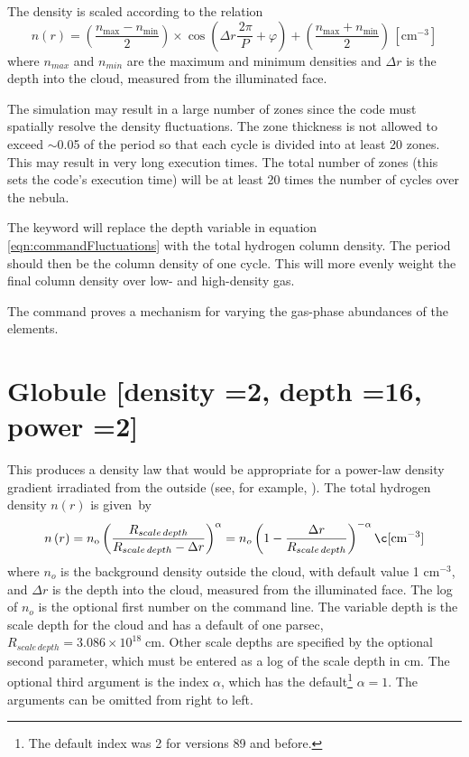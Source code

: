 The density is scaled according to the relation
\begin{equation}
\label{eqn:commandFluctuations}
n\left( r \right) = \left( {\frac{{n_{\max }  - n_{\min } }}{2}} \right)
\times \cos \left( {\Delta r\frac{{\,2\pi }}{P} + \varphi } \right) + \left(
{\frac{{n_{\max }  + n_{\min } }}{2}} \right)\, [\mathrm{cm}^{-3}]%
\end{equation}
where $n_{max}$ and $n_{min}$ are the maximum and minimum densities and
$\Delta r$ is the
depth into the cloud, measured from the illuminated face.

The simulation may result in a large number of zones since the code must
spatially resolve the density fluctuations.
The zone thickness is not
allowed to exceed ${\sim}$0.05 of the period so that each cycle is
divided into at least 20 zones.
This may result in very long execution times.
The total number of zones (this sets the code's execution time)
will be at least 20
times the number of cycles over the nebula.

The keyword  will replace
the depth variable in equation \ref{eqn:commandFluctuations} with
the total hydrogen column density.
The period should then be the column
density of one cycle.
This will more evenly weight the final column density
over low- and high-density gas.

The  command proves a mechanism
for varying the gas-phase abundances of the elements.

\section{Globule [density =2, depth =16, power =2]}

This produces a density law that would be appropriate for a power-law
density gradient irradiated from the outside (see, for example, \citealp{Williams1992}).  The total hydrogen density $n(r)$ is given~by
\begin{equation}
n\left( r \right) = n_{\mathrm{o}} \left( {\frac{{R_{scale\,depth}
}}{{R_{scale\,depth}  - \Delta r}}} \right)^\alpha   = n_o \left( {1 -
\frac{{\Delta r}}{{R_{scale\,depth} }}} \right)^{ - \alpha }
\c[\mathrm{cm}^{-3}]%
\end{equation}
where $n_o$ is the background density outside the cloud,
with default value
1 cm$^{-3}$, and $\Delta r$ is the depth into the cloud,
measured from the illuminated face.
The log of $n_o$ is the optional first number on the command line.
The variable  depth is the scale depth
for the cloud and has a default
of one parsec, $R_{scale\, depth} = 3.086\times 10^{18} \; \mathrm{cm}$.
Other scale depths are specified
by the optional second parameter, which must be entered as a log of the
scale depth in cm.
The optional third argument is the index $\alpha$, which has
the default\footnote{The default index was 2 for versions 89 and before.} $\alpha = 1$. The arguments can be omitted from right to left.

